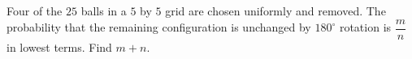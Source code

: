 Four of the $25$ balls in a $5$ by $5$ grid are chosen uniformly and removed. The probability that the remaining configuration is unchanged by $180^\circ$ rotation is $\dfrac{m}{n}$ in lowest terms. Find $m+n$.
